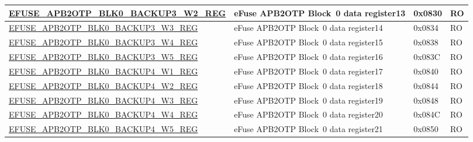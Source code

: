 \begin{longtable}{ | p{7cm} | p{6cm} | p{1.2cm} | p{1.5cm} | }
\hyperref[regdesc:EFUSEAPB2OTPBLK0BACKUP3WNREG]{EFUSE\_APB2OTP\_BLK0\_BACKUP3\_W2\_REG} & eFuse APB2OTP Block~0 data register13 & 0x0830 & RO \\\hline
\hyperref[regdesc:EFUSEAPB2OTPBLK0BACKUP3WNREG]{EFUSE\_APB2OTP\_BLK0\_BACKUP3\_W3\_REG} & eFuse APB2OTP Block~0 data register14 & 0x0834 & RO \\\hline
\hyperref[regdesc:EFUSEAPB2OTPBLK0BACKUP3WNREG]{EFUSE\_APB2OTP\_BLK0\_BACKUP3\_W4\_REG} & eFuse APB2OTP Block~0 data register15 & 0x0838 & RO \\\hline
\hyperref[regdesc:EFUSEAPB2OTPBLK0BACKUP3WNREG]{EFUSE\_APB2OTP\_BLK0\_BACKUP3\_W5\_REG} & eFuse APB2OTP Block~0 data register16 & 0x083C & RO \\\hline
\hyperref[regdesc:EFUSEAPB2OTPBLK0BACKUP4WNREG]{EFUSE\_APB2OTP\_BLK0\_BACKUP4\_W1\_REG} & eFuse APB2OTP Block~0 data register17 & 0x0840 & RO \\\hline
\hyperref[regdesc:EFUSEAPB2OTPBLK0BACKUP4WNREG]{EFUSE\_APB2OTP\_BLK0\_BACKUP4\_W2\_REG} & eFuse APB2OTP Block~0 data register18 & 0x0844 & RO \\\hline
\hyperref[regdesc:EFUSEAPB2OTPBLK0BACKUP4WNREG]{EFUSE\_APB2OTP\_BLK0\_BACKUP4\_W3\_REG} & eFuse APB2OTP Block~0 data register19 & 0x0848 & RO \\\hline
\hyperref[regdesc:EFUSEAPB2OTPBLK0BACKUP4WNREG]{EFUSE\_APB2OTP\_BLK0\_BACKUP4\_W4\_REG} & eFuse APB2OTP Block~0 data register20 & 0x084C & RO \\\hline
\hyperref[regdesc:EFUSEAPB2OTPBLK0BACKUP4WNREG]{EFUSE\_APB2OTP\_BLK0\_BACKUP4\_W5\_REG} & eFuse APB2OTP Block~0 data register21 & 0x0850 & RO \\\hline


\end{longtable}

